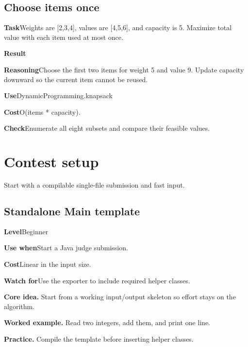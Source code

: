 \documentclass[10pt,letterpaper]{article}
\newcommand{\entrylabel}[1]{\textcolor{accent}{\bfseries #1}}
\begin{document}
\subsection*{Choose items once}
\noindent\entrylabel{Task}\quad Weights are [2,3,4], values are [4,5,6], and capacity is 5. Maximize total value with each item used at most once.\par
\noindent\entrylabel{Result}\par
\noindent\entrylabel{Reasoning}\quad Choose the first two items for weight 5 and value 9. Update capacity downward so the current item cannot be reused.\par
\noindent\entrylabel{Use}\quad DynamicProgramming.knapsack\par
\noindent\entrylabel{Cost}\quad O(items * capacity).\par
\noindent\entrylabel{Check}\quad Enumerate all eight subsets and compare their feasible values.\par
\clearpage
{}\section{Contest setup}
\begin{guidebox}Start with a compilable single-file submission and fast input.\end{guidebox}
\subsection{Standalone Main template}
\begin{guidebox}\small
\entrylabel{Level}\quad Beginner\par
\entrylabel{Use when}\quad Start a Java judge submission.\par
\entrylabel{Cost}\quad Linear in the input size.\par
\entrylabel{Watch for}\quad Use the exporter to include required helper classes.\par
\end{guidebox}
\noindent\textbf{Core idea.} Start from a working input/output skeleton so effort stays on the algorithm.\par
\noindent\textbf{Worked example.} Read two integers, add them, and print one line.\par
\noindent\textbf{Practice.} Compile the template before inserting helper classes.\par
\end{document}
